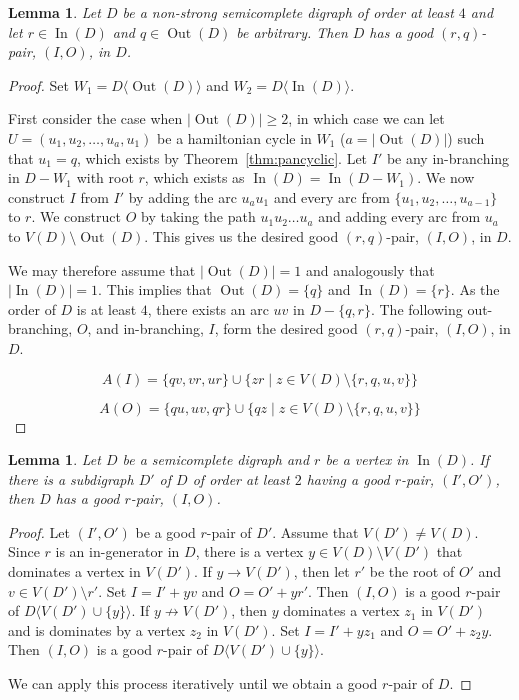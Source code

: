 \documentclass{article}
\newtheorem{lemma}[theorem]{Lemma}
\theoremstyle{definition}
\newcommand{\ra}{\rightarrow}
\DeclareMathOperator{\Out}{Out}
\DeclareMathOperator{\In}{In}
\newcommand{\2}{\vspace{0.2cm}}
\begin{document}
\begin{lemma}\label{lem:non-strong}
Let $D$ be a non-strong semicomplete digraph of order at least $4$ and
let $r \in \In(D)$ and $q \in \Out(D)$ be arbitrary.  Then $D$ has a
good $(r,q)$-pair, $(I,O)$, in $D$.
\end{lemma}
\begin{proof}
Set $W_1=D\langle \Out(D)\rangle$ and $W_2=D\langle \In(D)\rangle$.

First consider the case when $|\Out(D)| \geq 2$, in which case we can
let $U=(u_1, u_2, \ldots, u_a, u_1)$ be a hamiltonian cycle in $W_1$
($a=|\Out(D)|$) such that $u_1 = q$, which exists by
Theorem~\ref{thm:pancyclic}. Let $I'$ be any in-branching in $D-W_1$
with root $r$, which exists as $\In(D) = \In(D- W_1)$. We now
construct $I$ from $I'$ by adding the arc $u_a u_1$ and every arc from
$\{u_1,u_2,\ldots,u_{a-1}\}$ to $r$. We construct $O$ by taking the
path $u_1 u_2 \ldots u_a$ and adding every arc from $u_a$ to
$V(D)\setminus \Out(D)$.  This gives us the desired good $(r,q)$-pair,
$(I,O)$, in $D$.

We may therefore assume that $|\Out(D)| = 1$ and analogously that
$|\In(D)| = 1$.  This implies that $\Out(D)=\{q\}$ and $\In(D)=\{r\}$.
As the order of $D$ is at least $4$, there exists an arc $uv$ in
$D-\{q,r\}$.  The following out-branching, $O$, and in-branching, $I$,
form the desired good $(r,q)$-pair, $(I,O)$, in $D$.

\[
A(I) = \{qv, vr,ur\} \cup \{ z r \; | \; z \in V(D)\setminus \{r,q,u,v\} \}
\]

\[
A(O) = \{qu, uv, qr\} \cup \{ q z \; | \; z \in V(D)\setminus \{r,q,u,v\} \}
\]

\end{proof}




\begin{lemma}\label{lem:util}
Let $D$ be a semicomplete digraph and $r$ be a vertex in $\In(D)$.
If there is a subdigraph $D'$ of $D$ of order at least $2$ having a
good $r$-pair, $(I',O')$, then $D$ has a good $r$-pair, $(I,O)$.
\end{lemma}
\begin{proof}
Let $(I',O')$ be a good $r$-pair of $D'$.  Assume that $V(D')\neq
V(D)$.  Since $r$ is an in-generator in $D$, there is a vertex $y\in
V(D)\setminus V(D')$ that dominates a vertex in $V(D')$.  If $y\ra
V(D')$, then let $r'$ be the root of $O'$ and $v\in V(D')\setminus
r'$. Set $I=I' + yv$ and $O=O' + yr'$.  Then $(I,O)$ is a good
$r$-pair of $D\langle V(D')\cup\{y\}\rangle$.  If $y\not\ra V(D')$,
then $y$ dominates a vertex $z_1$ in $V(D')$ and is dominates by a
vertex $z_2$ in $V(D')$.  Set $I=I' + yz_1$ and $O=O' + z_2y$. Then
$(I,O)$ is a good $r$-pair of $D\langle V(D')\cup\{y\}\rangle$.
 
We can apply this process iteratively until we obtain a good $r$-pair of $D$.
\end{proof}
\end{document}
